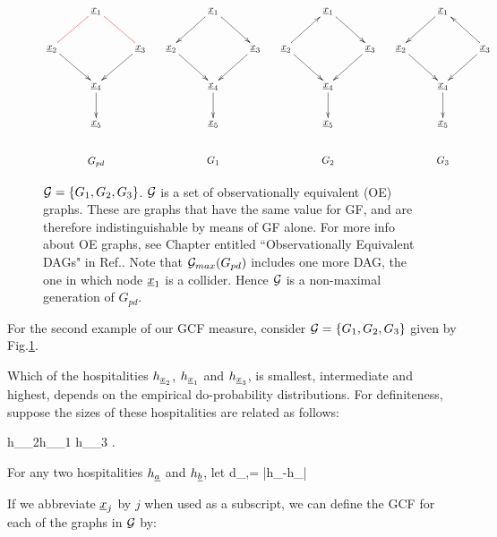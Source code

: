 \documentclass[12pt]{article}
\begin{document}
\begin{figure}[h!]
$$
\xymatrix{
&\rvx_1
\ar@[red]@{-}[dl]\ar@[red]@{-}[dr]
\\
\rvx_2\ar[dr]
&&\rvx_3\ar[dl]
\\
&\rvx_4\ar[d]
\\
&\rvx_5
\\
&G_{pd}
}
\;\;\;\;\;
\xymatrix{
&\rvx_1
\ar[dl]
\ar[dr]
\\
\rvx_2\ar[dr]
&&\rvx_3\ar[dl]
\\
&\rvx_4\ar[d]
\\
&\rvx_5
\\
&G_1
}
\;\;\;\;\;
\xymatrix{
&\rvx_1
\ar[dr]
\\
\rvx_2\ar[dr]\ar[ur]
&&\rvx_3\ar[dl]
\\
&\rvx_4\ar[d]
\\
&\rvx_5
\\
&G_2
}
\;\;\;\;\;
\xymatrix{
&\rvx_1
\ar[dl]
\\
\rvx_2\ar[dr]
&&\rvx_3\ar[dl]\ar[ul]
\\
&\rvx_4\ar[d]
\\
&\rvx_5
\\
&G_3
}
$$
\caption{${\cal G}=\{G_1, G_2, G_3\}$.
${\cal G}$ is a set of observationally
equivalent (OE) graphs. 
These are graphs that have the
same value for GF, and
are therefore indistinguishable
by means of GF alone. For more info about 
OE graphs, see Chapter
entitled ``Observationally Equivalent DAGs"
in Ref.\cite{bayesuvius}.
Note that ${\cal G}_{max}(G_{pd})$
includes one more DAG,
the one in which node ${\underline{x}}_1$
is a collider.
Hence ${\cal G}$
is a non-maximal generation of $G_{pd}$.}
\label{fig-ob-eq-2}
\end{figure}

For the second example of
our GCF measure,
consider 
${\cal G}=\{G_1, G_2, G_3\}$
given by Fig.\ref{fig-ob-eq-2}.

Which of the hospitalities
$h_{{\underline{x}}_2}$, $ h_{{\underline{x}}_1}$ and $h_{{\underline{x}}_3}$,
is smallest, intermediate and
highest, depends on the empirical
do-probability distributions.
For definiteness,
suppose the
sizes of these hospitalities
are related as follows:



\beq
h_{\rvx_2}\leq  h_{\rvx_1} \leq  h_{\rvx_3}
\;.
\eeq


For any two hospitalities
$h_{\underline{a}}$ and $h_{\underline{b}}$,
let
\beq
d_{\rvb,\rva}=
|h_\rvb-h_\rva|
\eeq

If we abbreviate ${\underline{x}}_j$ by $j$
when used as a subscript, 
we can define the GCF for each of
the graphs in ${\cal G}$ by:
\end{document}
